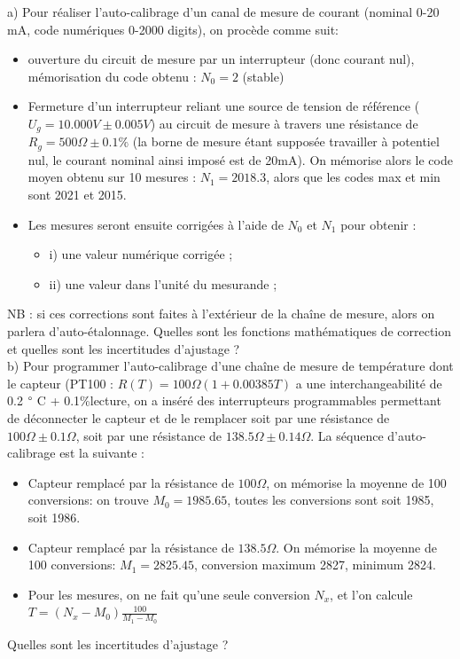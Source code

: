 \documentclass[main.tex]{subfiles}
\begin{document}
a)	Pour réaliser l'auto-calibrage d'un canal de mesure de courant (nominal 0-20 mA, code numériques 0-2000 digits), on procède comme suit:
\begin{itemize}
    \item ouverture du circuit de mesure par un interrupteur (donc courant nul), mémorisation du code obtenu :  $N_0=2$ (stable)
    \item Fermeture d'un interrupteur reliant une source de tension de référence ($U_g = 10.000V \pm 0.005V$) au circuit de mesure à travers une résistance de $R_g = 500 \Omega \pm 0.1\%$ (la borne de mesure étant supposée travailler à potentiel nul, le courant nominal ainsi imposé est de 20mA). On mémorise alors le code moyen obtenu sur 10 mesures : $N_1 = 2018.3$, alors que les codes max et min sont 2021 et 2015.
    \item Les mesures seront ensuite corrigées à l'aide de $N_0$ et $N_1$ pour obtenir :
          \begin{itemize}\itemsep1pt
                    \renewcommand{\labelitemi}{$\bullet$}
              \item i) une valeur numérique corrigée ;
              \item ii) une valeur dans l'unité du mesurande ;
          \end{itemize}
\end{itemize}
NB : si ces corrections sont faites à l'extérieur de la chaîne de mesure, alors on parlera d'auto-étalonnage.
Quelles sont les fonctions mathématiques de correction et quelles sont les incertitudes d'ajustage ?\\

b)	Pour programmer l'auto-calibrage d'une chaîne de mesure de température dont le capteur (PT100 : $R(T)=100 \Omega (1+0.00385T)$ a une interchangeabilité de 0.2 $\degree$ C + 0.1\%lecture, on a inséré des interrupteurs programmables permettant de déconnecter le capteur et de le remplacer soit par une résistance de$ 100 \Omega \pm 0.1 \Omega$, soit par une résistance de $138.5 \Omega \pm 0.14 \Omega$. La séquence d'auto-calibrage est la suivante :
\begin{itemize}
    \item Capteur remplacé par la résistance de $100 \Omega$, on mémorise la moyenne de 100 conversions: on trouve $M_0=1985.65$, toutes les conversions sont soit 1985, soit 1986.
    \item Capteur remplacé par la résistance de $138.5 \Omega$. On mémorise la moyenne de 100 conversions: $M_1=2825.45$, conversion maximum 2827, minimum 2824.
    \item Pour les mesures, on ne fait qu'une seule conversion $N_x$, et l'on calcule \\
          $T= (N_x - M_0)\frac{100}{M_1 - M_0}$
\end{itemize}
Quelles sont les incertitudes d'ajustage ? \\
\end{document}

